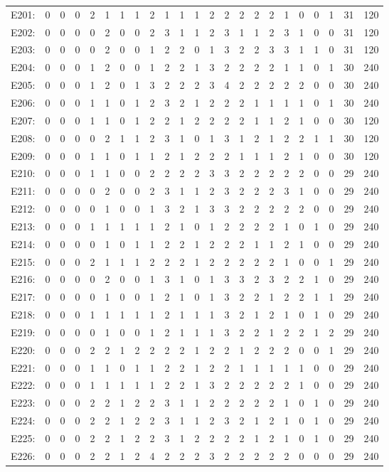 \documentclass[12pt]{article}
\begin{document}
\begin{center}
\scriptsize
\begin{tabular}{ccccccccccccccccccccc|c|c}
E201:&0&0&0&2&1&1&1&2&1&1&1&2&2&2&2&2&1&0&0&1&31&120\\
E202:&0&0&0&0&2&0&0&2&3&1&1&2&3&1&1&2&3&1&0&0&31&120\\
E203:&0&0&0&0&2&0&0&1&2&2&0&1&3&2&2&3&3&1&1&0&31&120\\
E204:&0&0&0&1&2&0&0&1&2&2&1&3&2&2&2&2&1&1&0&1&30&240\\
E205:&0&0&0&1&2&0&1&3&2&2&2&3&4&2&2&2&2&2&0&0&30&240\\
E206:&0&0&0&1&1&0&1&2&3&2&1&2&2&2&1&1&1&1&0&1&30&240\\
E207:&0&0&0&1&1&0&1&2&2&1&2&2&2&2&1&1&2&1&0&0&30&120\\
E208:&0&0&0&0&2&1&1&2&3&1&0&1&3&1&2&1&2&2&1&1&30&120\\
E209:&0&0&0&1&1&0&1&1&2&1&2&2&2&1&1&1&2&1&0&0&30&120\\
E210:&0&0&0&1&1&0&0&2&2&2&2&3&3&2&2&2&2&2&0&0&29&240\\
E211:&0&0&0&0&2&0&0&2&3&1&1&2&3&2&2&2&3&1&0&0&29&240\\
E212:&0&0&0&0&1&0&0&1&3&2&1&3&3&2&2&2&2&2&0&0&29&240\\
E213:&0&0&0&1&1&1&1&1&2&1&0&1&2&2&2&2&1&0&1&0&29&240\\
E214:&0&0&0&0&1&0&1&1&2&2&1&2&2&2&1&1&2&1&0&0&29&240\\
E215:&0&0&0&2&1&1&1&2&2&2&1&2&2&2&2&2&1&0&0&1&29&240\\
E216:&0&0&0&0&2&0&0&1&3&1&0&1&3&3&2&3&2&2&1&0&29&240\\
E217:&0&0&0&0&1&0&0&1&2&1&0&1&3&2&2&1&2&2&1&1&29&240\\
E218:&0&0&0&1&1&1&1&1&2&1&1&1&3&2&1&2&1&0&1&0&29&240\\
E219:&0&0&0&0&1&0&0&1&2&1&1&1&3&2&2&1&2&2&1&2&29&240\\
E220:&0&0&0&2&2&1&2&2&2&2&1&2&2&1&2&2&2&0&0&1&29&240\\
E221:&0&0&0&1&1&0&1&1&2&2&1&2&2&1&1&1&1&1&0&0&29&240\\
E222:&0&0&0&1&1&1&1&1&2&2&1&3&2&2&2&2&2&1&0&0&29&240\\
E223:&0&0&0&2&2&1&2&2&3&1&1&2&2&2&2&2&1&0&1&0&29&240\\
E224:&0&0&0&2&2&1&2&2&3&1&1&2&3&2&1&2&1&0&1&0&29&240\\
E225:&0&0&0&2&2&1&2&2&3&1&2&2&2&2&1&2&1&0&1&0&29&240\\
E226:&0&0&0&2&2&1&2&4&2&2&2&3&2&2&2&2&2&0&0&0&29&240\\

\end{tabular}
\end{center}
\end{document}
